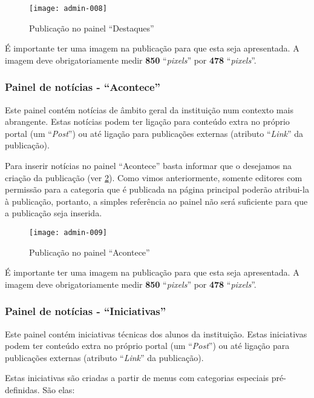 \begin{figure}[!ht]
    \centering
    \texttt{[image: admin-008]}
    \caption{Publicação no painel ``Destaques''}\label{RS0006:fig:admin-008}
\end{figure}

É importante ter uma imagem na publicação para que esta seja apresentada. A imagem deve obrigatoriamente medir \textbf{850} ``\textit{pixels}'' por \textbf{478} ``\textit{pixels}''.

\subsubsection{Painel de notícias - ``Acontece''}

Este painel contém notícias de âmbito geral da instituição num contexto mais abrangente. Estas notícias podem ter ligação para conteúdo extra no próprio portal (um ``\textit{Post}'') ou até ligação para publicações externas (atributo ``\textit{Link}'' da publicação).

Para inserir notícias no painel ``Acontece'' basta informar que o desejamos na criação da publicação (ver \cref{RS0006:fig:admin-009}). Como vimos anteriormente, somente editores com permissão para a categoria que é publicada na página principal poderão atribui-la à publicação, portanto, a simples referência ao painel não será suficiente para que a publicação seja inserida.

\begin{figure}[!ht]
    \centering
    \texttt{[image: admin-009]}
    \caption{Publicação no painel ``Acontece''}\label{RS0006:fig:admin-009}
\end{figure}

É importante ter uma imagem na publicação para que esta seja apresentada. A imagem deve obrigatoriamente medir \textbf{850} ``\textit{pixels}'' por \textbf{478} ``\textit{pixels}''.

\subsubsection{Painel de notícias - ``Iniciativas''}

Este painel contém iniciativas técnicas dos alunos da instituição. Estas iniciativas podem ter conteúdo extra no próprio portal (um ``\textit{Post}'') ou até ligação para publicações externas (atributo ``\textit{Link}'' da publicação).

Estas iniciativas são criadas a partir de menus com categorias especiais pré-definidas. São elas:

